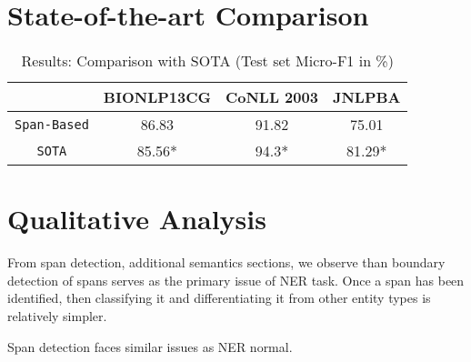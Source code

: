 \section{State-of-the-art Comparison}
\label{sec:sota_comparison}

\begin{table}[h!]
\centering
\begin{tabular}{|c|c|c|c|}\hline
	\textbf{} & \textbf{BIONLP13CG} & \textbf{CoNLL 2003} & \textbf{JNLPBA}\\\hline
	\texttt{Span-Based} & 86.83 & 91.82 & 75.01\\\hline
	\texttt{SOTA} & 85.56* & 94.3* & 81.29*\\\hline
	\end{tabular}
    \caption{Results: Comparison with SOTA (Test set Micro-F1 in \%)}
    \label{tab:context_bio_dataset}
\end{table}

\section{Qualitative Analysis}
\label{sec:qualitative_analysis}
From span detection, additional semantics sections, we observe than boundary detection of spans serves as the primary issue of NER task. Once a span has been identified, then classifying it and differentiating it from other entity types is relatively simpler.

Span detection faces similar issues as NER normal.